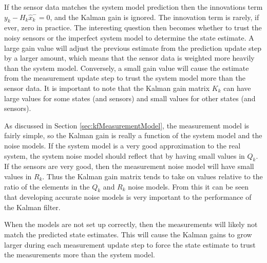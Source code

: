 If the sensor data matches the system model prediction then the innovations term $y_k-H_k\hat{x}_k^-=0$, and the Kalman gain is ignored. The innovation term is rarely, if ever, zero in practice. The interesting question then becomes whether to trust the noisy sensors or the imperfect system model to determine the state estimate. A large gain value will adjust the previous estimate from the prediction update step by a larger amount, which means that the sensor data is weighted more heavily than the system model. Conversely, a small gain value will cause the estimate from the measurement update step to trust the system model more than the sensor data. It is important to note that the Kalman gain matrix $K_k$ can have large values for some states (and sensors) and small values for other states (and sensors).

As discussed in Section \ref{sec:kfMeasurementModel}, the measurement model is fairly simple, so the Kalman gain is really a function of the system model and the noise models. If the system model is a very good approximation to the real system, the system noise model should reflect that by having small values in $Q_k$. If the sensors are very good, then the measurement noise model will have small values in $R_k$. Thus the Kalman gain matrix tends to take on values relative to the ratio of the elements in the $Q_k$ and $R_k$ noise models. From this it can be seen that developing accurate noise models is very important to the performance of the Kalman filter.

When the models are not set up correctly, then the measurements will likely not match the predicted state estimates. This will cause the Kalman gains to grow larger during each measurement update step to force the state estimate to trust the measurements more than the system model.

